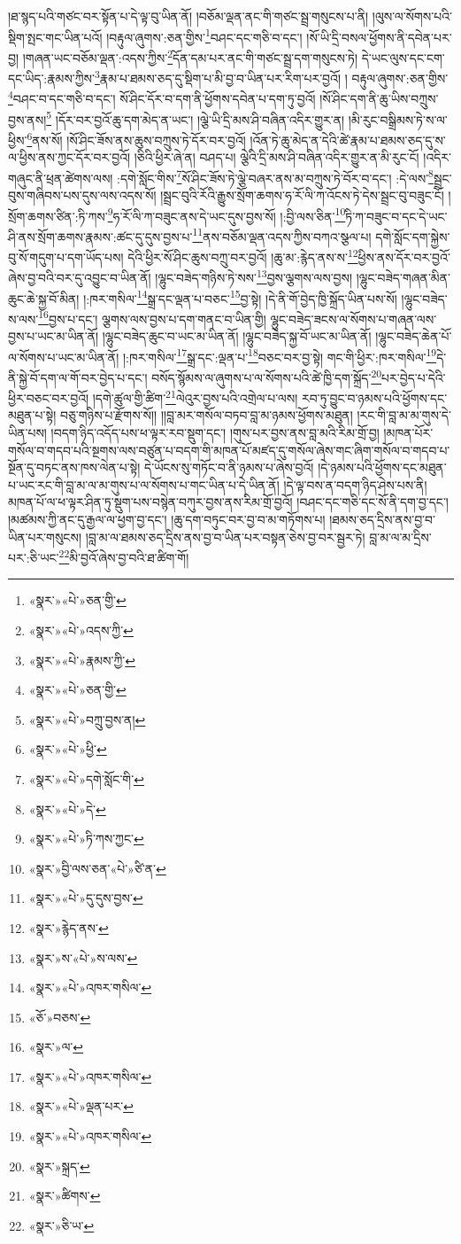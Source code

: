 །ཐ་སྙད་པའི་གཙང་བར་སྟོན་པ་དེ་ལྟ་བུ་ཡིན་ནོ། །བཅོམ་ལྡན་ནང་གི་གཙང་སྦྲ་གསུངས་པ་ནི། །ལུས་ལ་སོགས་པའི་སྡིག་སྤང་གང་ཡིན་པའོ། །བརྟུལ་ཞུགས་:ཅན་གྱིས་\footnote{«སྣར་»«པེ་»ཅན་གྱི་}བཤང་དང་གཅི་བ་དང་། །སོ་ཡི་དྲི་བསལ་ཕྱོགས་ནི་དབེན་པར་བྱ། །གཞན་ཡང་བཅོམ་ལྡན་:འདས་ཀྱིས་\footnote{«སྣར་»«པེ་»འདས་ཀྱི་}དོན་དམ་པར་ནང་གི་གཙང་སྦྲ་དག་གསུངས་ཏེ། དེ་ཡང་ལུས་དང་ངག་དང་ཡིད་:རྣམས་ཀྱིས་\footnote{«སྣར་»«པེ་»རྣམས་ཀྱི་}རྣམ་པ་ཐམས་ཅད་དུ་སྡིག་པ་མི་བྱ་བ་ཡིན་པར་རིག་པར་བྱའོ། །
བརྟུལ་ཞུགས་:ཅན་གྱིས་\footnote{«སྣར་»«པེ་»ཅན་གྱི་}བཤང་བ་དང་གཅི་བ་དང་། སོ་ཤིང་དོར་བ་དག་ནི་ཕྱོགས་དབེན་པ་དག་ཏུ་བྱའོ། །སོ་ཤིང་དག་ནི་ཆུ་ཡིས་བཀྲུས་བྱས་ནས།\footnote{«སྣར་»«པེ་»བཀྲུ་བྱས་ན།} །དོར་བར་བྱའོ་ཆུ་དག་མེད་ན་ཡང་། །ལྕེ་ཡི་དྲི་མས་ཤི་བཞིན་འདིར་གྱུར་ན། །མི་རུང་བསྒྲིམས་ཏེ་ས་ལ་ཕྱིས་\footnote{«སྣར་»«པེ་»ཕྱི་}ནས་སོ། །སོ་ཤིང་ཟོས་ནས་ཆུས་བཀྲུས་ཏེ་དོར་བར་བྱའོ། །འོན་ཏེ་ཆུ་མེད་ན་དེའི་ཚེ་རྣམ་པ་ཐམས་ཅད་དུ་ས་ལ་ཕྱིས་ནས་ཀྱང་དོར་བར་བྱའོ། །ཅིའི་ཕྱིར་ཞེ་ན། བཤད་པ། ལྕེའི་དྲི་མས་ཤི་བཞིན་འདིར་གྱུར་ན་མི་རུང་ངོ། །འདིར་གཞུང་ནི་ཕྲན་ཚེགས་ལས། :དགེ་སློང་གིས་\footnote{«སྣར་»«པེ་»དགེ་སློང་གི་}སོ་ཤིང་ཟོས་ཏེ་ལྕེ་བཞར་ནས་མ་བཀྲུས་ཏེ་བོར་བ་དང་། :དེ་ལས་\footnote{«སྣར་»«པེ་»དེ་}སྦྲང་བུས་གཞིབས་པས་དུས་ལས་འདས་སོ། །སྦྲང་བུའི་རོའི་རྒྱུས་སྲོག་ཆགས་ཧ་རོ་ལི་ཀ་འོངས་ཏེ་དེས་སྦྲང་བུ་བཟུང་ངོ། །སྲོག་ཆགས་ཙིན་:ཏི་ཀས་\footnote{«སྣར་»«པེ་»ཏི་ཀས་ཀྱང་}ཧ་རོ་ལི་ཀ་བཟུང་ནས་དེ་ཡང་དུས་བྱས་སོ། །:བྱི་ལས་ཅིན་\footnote{«སྣར་»བྱི་ལས་ཅན་«པེ་»ཙི་ན་}ཏི་ཀ་བཟུང་བ་དང་དེ་ཡང་ཤི་ནས་སྲོག་ཆགས་རྣམས་:ཚང་དུ་དུས་བྱས་པ་\footnote{«སྣར་»«པེ་»དུ་དུས་བྱས་}ནས་བཅོམ་ལྡན་འདས་ཀྱིས་བཀའ་སྩལ་པ། དགེ་སློང་དག་སྐྱེས་བུ་སོ་གདུག་པ་དག་ཡོད་པས། དེའི་ཕྱིར་སོ་ཤིང་ཆུས་བཀྲུ་བར་བྱའོ། །ཆུ་མ་:རྙེད་ནས་ས་\footnote{«སྣར་»རྙེད་ནས་}ཕྱིས་ནས་དོར་བར་བྱའོ་ཞེས་བྱ་བའི་བར་དུ་འབྱུང་བ་ཡིན་ནོ། །ལྷུང་བཟེད་གཉིས་ཏེ་སས་\footnote{«སྣར་»ས་«པེ་»ས་ལས་}བྱས་ལྕགས་ལས་བྱས། །ལྷུང་བཟེད་གཞན་མིན་ཆུང་ཆེ་སྐྱ་བོ་མིན། །:ཁར་གསིལ་\footnote{«སྣར་»«པེ་»འཁར་གསིལ་}སྒྲ་དང་ལྡན་པ་བཅང་\footnote{«ཅོ་»བཅས་}བྱ་སྟེ། །དེ་ནི་གོ་བྱེད་ཁྱི་སྐྲོད་ཡིན་པས་སོ། །ལྷུང་བཟེད་ས་ལས་\footnote{«སྣར་»ལ་}བྱས་པ་དང་། ལྕགས་ལས་བྱས་པ་དག་གནང་བ་ཡིན་གྱི། ལྷུང་བཟེད་ཟངས་ལ་སོགས་པ་གཞན་ལས་བྱས་པ་ཡང་མ་ཡིན་ནོ། །ལྷུང་བཟེད་ཆུང་བ་ཡང་མ་ཡིན་ནོ། །ལྷུང་བཟེད་སྐྱ་བོ་ཡང་མ་ཡིན་ནོ། །ལྷུང་བཟེད་ཆེན་པོ་ལ་སོགས་པ་ཡང་མ་ཡིན་ནོ། །:ཁར་གསིལ་\footnote{«སྣར་»«པེ་»འཁར་གསིལ་}སྒྲ་དང་:ལྡན་པ་\footnote{«སྣར་»«པེ་»ལྡན་པར་}བཅང་བར་བྱ་སྟེ། གང་གི་ཕྱིར་:ཁར་གསིལ་\footnote{«སྣར་»«པེ་»འཁར་གསིལ་}དེ་ནི་སྐྱེ་བོ་དག་ལ་གོ་བར་བྱེད་པ་དང་། བསོད་སྙོམས་ལ་ཞུགས་པ་ལ་སོགས་པའི་ཚེ་ཁྱི་དག་སྐྲོད་\footnote{«སྣར་»སྐྲད་}པར་བྱེད་པ་དེའི་ཕྱིར་བཅང་བར་བྱའོ། །དགེ་ཚུལ་གྱི་ཚིག་\footnote{«སྣར་»ཚིགས་}ལེའུར་བྱས་པའི་འགྲེལ་པ་ལས། རབ་ཏུ་བྱུང་བ་ཉམས་པའི་ཕྱོགས་དང་མཐུན་པ་སྟེ། བཅུ་གཉིས་པ་རྫོགས་སོ།། །།བླ་མར་གསོལ་བཏབ་བླ་མ་ཉམས་ཕྱོགས་མཐུན། །རང་གི་བླ་མ་མ་གུས་དེ་ཡིན་པས། །བདག་ཉིད་འདོད་པས་ཕ་ལྟར་རབ་སྡུག་དང་། །གུས་པར་བྱས་ནས་བླ་མའི་རིམ་གྲོ་བྱ། །མཁན་པོར་གསོལ་བ་གདབ་པའི་སྔགས་ལས་བཙུན་པ་བདག་གི་མཁན་པོ་མཛད་དུ་གསོལ་ཞེས་གང་ཞིག་གསོལ་བ་གདབ་པ་སྔོན་དུ་བཏང་ནས་ཁས་ལེན་པ་སྟེ། དེ་ཡོངས་སུ་གཏོང་བ་ནི་ཉམས་པ་ཞེས་བྱའོ། །དེ་ཉམས་པའི་ཕྱོགས་དང་མཐུན་པ་ཡང་རང་གི་བླ་མ་ལ་མ་གུས་པ་ལ་སོགས་པ་གང་ཡིན་པ་དེ་ཡིན་ནོ། །དེ་ལྟ་བས་ན་བདག་ཉིད་ཤེས་པས་ནི། མཁན་པོ་ལ་ཕ་ལྟར་ཤིན་ཏུ་སྡུག་པས་བསྙེན་བཀུར་བྱས་ནས་རིམ་གྲོ་བྱའོ། །བཤང་དང་གཅི་དང་སོ་ནི་དག་བྱ་དང་། །མཚམས་ཀྱི་ནང་དུ་རྒྱལ་ལ་ཕྱག་བྱ་དང་། །ཆུ་དག་བཏུང་བར་བྱ་བ་མ་གཏོགས་པ། །ཐམས་ཅད་དྲིས་ནས་བྱ་བ་ཡིན་པར་གསུངས། །བླ་མ་ལ་ཐམས་ཅད་དྲིས་ནས་བྱ་བ་ཡིན་པར་བསྟན་ཅེས་བྱ་བར་སྦྱར་ཏེ། བླ་མ་ལ་མ་དྲིས་པར་:ཅི་ཡང་\footnote{«སྣར་»ཅི་ཡ་}མི་བྱའོ་ཞེས་བྱ་བའི་ཐ་ཚིག་གོ། 